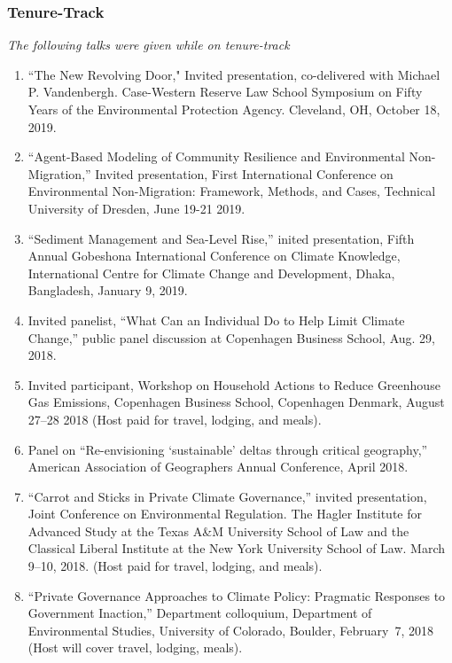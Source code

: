 %
%
\subsubsection{Tenure-Track}
\emph{The following talks were given while on tenure-track}
\begin{enumerate}
\item ``The New Revolving Door," Invited presentation, co-delivered with Michael P. Vandenbergh. Case-Western Reserve Law School Symposium on Fifty Years of the Environmental Protection Agency. Cleveland, OH, October 18, 2019.
\item ``Agent-Based Modeling of Community Resilience and Environmental Non-Migration,'' Invited presentation, First International Conference on Environmental Non-Migration: Framework, Methods, and Cases, Technical University of Dresden, June 19-21 2019.
\item ``Sediment Management and Sea-Level Rise,'' inited presentation, Fifth Annual Gobeshona International Conference on Climate Knowledge, International Centre for Climate Change and Development, Dhaka, Bangladesh, January 9, 2019.
\item Invited panelist, ``What Can an Individual Do to Help Limit Climate Change,'' public panel discussion at Copenhagen Business School, Aug. 29, 2018.
\item Invited participant, Workshop on Household Actions to Reduce Greenhouse Gas Emissions, Copenhagen Business School, Copenhagen Denmark, August 27--28 2018 (Host paid for travel, lodging, and meals).
\item Panel on ``Re-envisioning `sustainable' deltas through critical geography,'' American Association of Geographers Annual Conference, April 2018.
\item ``Carrot and Sticks in Private Climate Governance,'' invited presentation, Joint Conference on Environmental Regulation. The Hagler Institute for Advanced Study at the Texas A\&M University School of Law and the Classical Liberal Institute at the New York University School of Law. March 9--10, 2018. (Host paid for travel, lodging, and meals).
\item ``Private Governance Approaches to Climate Policy: Pragmatic Responses to Government Inaction,'' Department colloquium, Department of Environmental Studies, University of Colorado, Boulder, February~7, 2018 (Host will cover travel, lodging, meals).

\end{enumerate}
